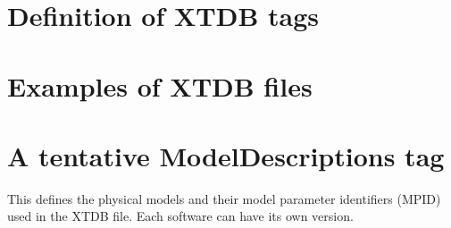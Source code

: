 \documentclass[preprint,review,12pt]{elsarticle}
\begin{document}
\newpage

\begin{appendix}

\setcounter{equation}{0}
\renewcommand{\theequation}{C\arabic{equation}}
\setcounter{figure}{0}
\renewcommand{\thefigure}{C\arabic{figure}}

\section{Definition of XTDB tags}


\setcounter{equation}{0}
\renewcommand{\theequation}{B\arabic{equation}}
\setcounter{figure}{0}
\renewcommand{\thefigure}{B\arabic{figure}}

\section{Examples of XTDB files}\label{sc:examples}


\setcounter{equation}{0}
\renewcommand{\theequation}{C\arabic{equation}}
\setcounter{figure}{0}
\renewcommand{\thefigure}{C\arabic{figure}}


\section{A tentative ModelDescriptions tag}\label{sc:modeltags}\label{sc:magmod}

This defines the physical models and their model parameter identifiers
(MPID) used in the XTDB file.  Each software can have its own version.


\end{appendix}
\end{document}
